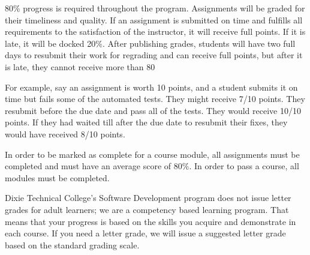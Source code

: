 80\% progress is required throughout the program.
Assignments will be graded for their timeliness and quality.
If an assignment is submitted on time and fulfills all requirements
to the satisfaction of the instructor, it will receive full points.
If it is late, it will be docked 20\%. After publishing grades,
students will have two full days to resubmit their work for regrading
and can receive full points, but after it is late, they cannot receive more than 80%
\par
\bigskip
For example, say an assignment is worth 10 points, and a student
submits it on time but fails some of the automated tests.
They might receive 7/10 points. They resubmit before the due date
and pass all of the tests. They would receive 10/10 points.
If they had waited till after the due date to resubmit their fixes,
they would have received 8/10 points.
\par
\bigskip
In order to be marked as complete for a course module,
all assignments must be completed and must have an average
score of 80\%. In order to pass a course, all modules must be completed.
\par
\bigskip
Dixie Technical College's Software Development program does not issue
letter grades for adult learners; we are a competency based learning program.
That means that your progress is based on the skills you acquire and
demonstrate in each course. If you need a letter grade, we will issue
a suggested letter grade based on the standard grading scale.
